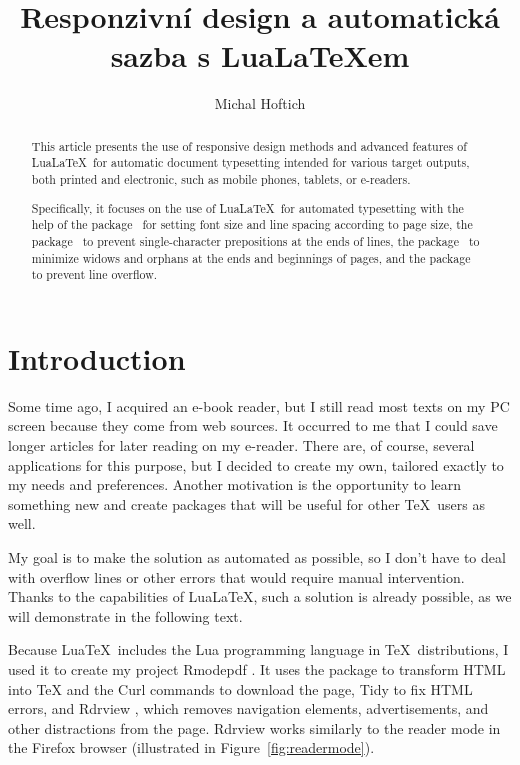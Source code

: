 \documentclass{ltugboat}
\title{Responzivní design a automatická sazba s Lua\LaTeX em}
\author{Michal Hoftich}
\newcommand\program[1]{#1}
\begin{document}
\maketitle

\begin{abstract}
This article presents the use of responsive design methods and advanced features
of Lua\LaTeX\ for automatic document typesetting intended for various target outputs,
both printed and electronic, such as mobile phones, tablets, or e-readers.

Specifically, it focuses on the use of Lua\LaTeX\ for automated
typesetting with the help of the  package~\cite{responsive} for setting font size and line spacing
according to page size, the  package~\cite{luavlna} to prevent single-character prepositions
at the ends of lines, the  package~\cite{lua-widow-control} to minimize widows and orphans at the ends and
beginnings of pages, and the  package~\cite{linebreaker} to prevent line overflow.

\end{abstract}


\section{Introduction}

Some time ago, I acquired an e-book reader, but I still read most texts on my
PC screen because they come from web sources. It occurred to me that I could
save longer articles for later reading on my e-reader. There are, of course,
several applications for this purpose, but I decided to create my own, tailored
exactly to my needs and preferences. Another motivation is the opportunity to
learn something new and create packages that will be useful for other \TeX\
users as well.

My goal is to make the solution as automated as possible, so I don't have to
deal with overflow lines or other errors that would require manual
intervention. Thanks to the capabilities of Lua\LaTeX, such a solution is
already possible, as we will demonstrate in the following text.

Because Lua\TeX\ includes the Lua programming language in \TeX\ distributions,
I used it to create my project \program{Rmodepdf} \cite{rmodepdf}. It uses the
\tbcode{LuaXML} package \cite{luaxml} to transform HTML into \TeX{} and the
\program{Curl} commands to download the page, \program{Tidy} to fix HTML
errors, and \program{Rdrview} \cite{rdrview}, which removes navigation
elements, advertisements, and other distractions from the page.
\program{Rdrview} works similarly to the reader mode in the \program{Firefox}
browser (illustrated in Figure~\ref{fig:readermode}).
\end{document}
